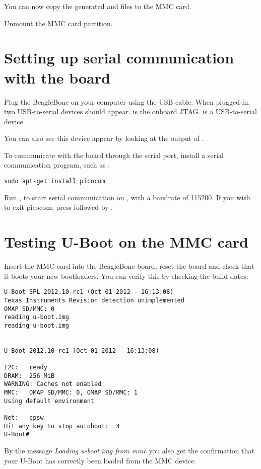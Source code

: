 You can now copy the generated  and  files to the MMC card.

Unmount the MMC card partition.

\section{Setting up serial communication with the board}

Plug the BeagleBone on your computer using the USB cable.
When plugged-in, two USB-to-serial devices should appear.
 is the onboard JTAG.
 is a USB-to-serial device.

You can also see this device appear by looking at the output of
.

To communicate with the board through the serial port, install a
serial communication program, such as :

\begin{verbatim}
sudo apt-get install picocom
\end{verbatim}

Run , to start serial
communication on , with a baudrate of 115200. If
you wish to exit picocom, press \code{[Ctrl][a]} followed by
\code{[Ctrl][x]}.

\section{Testing U-Boot on the MMC card}

Insert the MMC card into the BeagleBone board, reset the board and check
that it boots your new bootloaders. You can verify this by checking
the build dates:

\begin{verbatim}
U-Boot SPL 2012.10-rc1 (Oct 01 2012 - 16:13:08)
Texas Instruments Revision detection unimplemented
OMAP SD/MMC: 0
reading u-boot.img
reading u-boot.img


U-Boot 2012.10-rc1 (Oct 01 2012 - 16:13:08)

I2C:   ready
DRAM:  256 MiB
WARNING: Caches not enabled
MMC:   OMAP SD/MMC: 0, OMAP SD/MMC: 1
Using default environment

Net:   cpsw
Hit any key to stop autoboot:  3
U-Boot#
\end{verbatim}

By the message {\em Loading u-boot.img from mmc} you also get the
confirmation that your U-Boot has correctly been loaded from the MMC
device.

